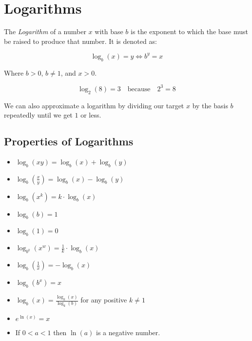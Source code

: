 \newpage
\section{Logarithms}

The \emph{Logarithm} of a number \(x\) 
with base \(b\) is the exponent to which the base must be raised to produce that number. It is 
denoted as:

\[
    \log_b(x) = y \iff b^y = x
\]

Where \(b > 0\), \(b \neq 1\), and \(x > 0\).

\[
    \log_2(8) = 3 \quad \text{because} \quad 2^3 = 8
\]

We can also approximate a logarithm by dividing our target \(x\) by the basis \(b\) repeatedly until 
we get \(1\) or less.

\subsection{Properties of Logarithms}

\begin{itemize}

    \item \(\log_b(xy) = \log_b(x) + \log_b(y)\)

    \item \(\log_b\left(\frac{x}{y}\right) = \log_b(x) - \log_b(y)\)

    \item \(\log_b(x^k) = k \cdot \log_b(x)\)

    \item \(\log_b(b) = 1\)

    \item \(\log_b(1) = 0\)

    \item \(\log_{b^k}(x^w) = \frac{1}{k} \cdot \log_b(x)\)

    \item \(\log_b\left(\frac{1}{x}\right) = -\log_b(x)\)

    \item \(\log_b(b^x) = x\)

    \item \(\log_b(x) = \frac{\log_k(x)}{\log_k(b)}\) for any positive \(k \neq 1\)

    \item \(e^{\ln(x)} = x\)

    \item If \(0 < a < 1\) then \(\ln(a)\) is a negative number. 

\end{itemize}

